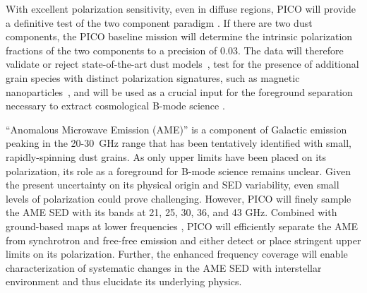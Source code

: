 \documentclass[PICOReport.tex]{subfiles}
\begin{document}
With excellent polarization sensitivity, even in diffuse regions, PICO will provide a definitive test of the two component paradigm \citep{Meisner2015}. 
If there are two dust components, the PICO baseline mission will determine the intrinsic polarization fractions of the two components to a precision of 0.03. The data will therefore validate or reject state-of-the-art dust models~\citep[e.g.][Hensley \& Draine, in prep]{Guillet2018}, test for the presence of additional grain species with distinct polarization signatures, such as magnetic nanoparticles~\citep{Draine2013}, and will be used as a crucial input for the foreground separation necessary to extract cosmological B-mode science . %
%

``Anomalous Microwave Emission (AME)'' is a component of Galactic emission peaking in the 20-30~GHz range that has been tentatively identified with small, rapidly-spinning dust grains.\citep{dickinson/etal:2018} As only upper limits have been placed on its polarization, its role as a foreground for B-mode science remains unclear. Given the present uncertainty on its physical origin and SED variability, even small levels of polarization could prove challenging. However, PICO will finely sample the AME SED with its bands at 21, 25, 30, 36, and 43 GHz. Combined with ground-based maps at lower frequencies \citep[e.g., C-BASS][at 5~GHz]{Dickinson2018a}, PICO will efficiently separate the AME from synchrotron and free-free emission and either detect or place stringent upper limits on its polarization.
Further, the enhanced frequency coverage will enable characterization of systematic changes in the AME SED with interstellar environment and thus elucidate its underlying physics.
\end{document}
